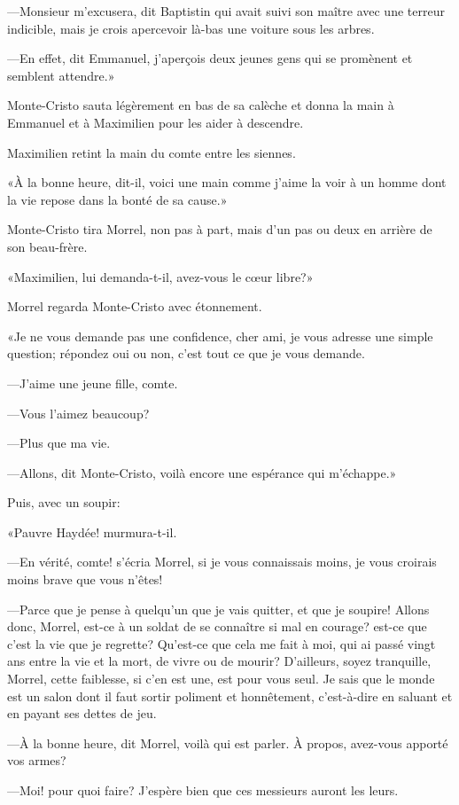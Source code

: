 —Monsieur m'excusera, dit Baptistin qui avait suivi son maître avec une terreur indicible, mais je crois apercevoir là-bas une voiture sous les arbres. 

—En effet, dit Emmanuel, j'aperçois deux jeunes gens qui se promènent et semblent attendre.» 

Monte-Cristo sauta légèrement en bas de sa calèche et donna la main à Emmanuel et à Maximilien pour les aider à descendre. 

Maximilien retint la main du comte entre les siennes. 

«À la bonne heure, dit-il, voici une main comme j'aime la voir à un homme dont la vie repose dans la bonté de sa cause.» 

Monte-Cristo tira Morrel, non pas à part, mais d'un pas ou deux en arrière de son beau-frère. 

«Maximilien, lui demanda-t-il, avez-vous le cœur libre?» 

Morrel regarda Monte-Cristo avec étonnement. 

«Je ne vous demande pas une confidence, cher ami, je vous adresse une simple question; répondez oui ou non, c'est tout ce que je vous demande. 

—J'aime une jeune fille, comte. 

—Vous l'aimez beaucoup? 

—Plus que ma vie. 

—Allons, dit Monte-Cristo, voilà encore une espérance qui m'échappe.» 

Puis, avec un soupir: 

«Pauvre Haydée! murmura-t-il. 

—En vérité, comte! s'écria Morrel, si je vous connaissais moins, je vous croirais moins brave que vous n'êtes! 

—Parce que je pense à quelqu'un que je vais quitter, et que je soupire! Allons donc, Morrel, est-ce à un soldat de se connaître si mal en courage? est-ce que c'est la vie que je regrette? Qu'est-ce que cela me fait à moi, qui ai passé vingt ans entre la vie et la mort, de vivre ou de mourir? D'ailleurs, soyez tranquille, Morrel, cette faiblesse, si c'en est une, est pour vous seul. Je sais que le monde est un salon dont il faut sortir poliment et honnêtement, c'est-à-dire en saluant et en payant ses dettes de jeu. 

—À la bonne heure, dit Morrel, voilà qui est parler. À propos, avez-vous apporté vos armes? 

—Moi! pour quoi faire? J'espère bien que ces messieurs auront les leurs. 

